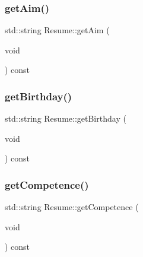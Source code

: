 \hypertarget{class_resume_a65f42d7448ffe5ecdbc33663ad9339e0}{}\label{class_resume_a65f42d7448ffe5ecdbc33663ad9339e0} 
\subsubsection{\texorpdfstring{get\+Aim()}{getAim()}}
{\footnotesize\ttfamily std\+::string Resume\+::get\+Aim (\begin{DoxyParamCaption}\item[{void}]{ }\end{DoxyParamCaption}) const\hspace{0.3cm}{\ttfamily [inline]}}

\hypertarget{class_resume_a68cfeeffdaa6cb63701593b2c086d274}{}\label{class_resume_a68cfeeffdaa6cb63701593b2c086d274} 
\subsubsection{\texorpdfstring{get\+Birthday()}{getBirthday()}}
{\footnotesize\ttfamily std\+::string Resume\+::get\+Birthday (\begin{DoxyParamCaption}\item[{void}]{ }\end{DoxyParamCaption}) const\hspace{0.3cm}{\ttfamily [inline]}}

\hypertarget{class_resume_afd0ba86a30b73693a6eda28c9ecf7860}{}\label{class_resume_afd0ba86a30b73693a6eda28c9ecf7860} 
\subsubsection{\texorpdfstring{get\+Competence()}{getCompetence()}}
{\footnotesize\ttfamily std\+::string Resume\+::get\+Competence (\begin{DoxyParamCaption}\item[{void}]{ }\end{DoxyParamCaption}) const\hspace{0.3cm}{\ttfamily [inline]}}

\hypertarget{class_resume_ac4c445be5628971ce45ab02213e6769f}{}\label{class_resume_ac4c445be5628971ce45ab02213e6769f} 
